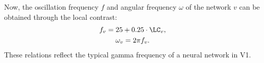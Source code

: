 Now, the oscillation  frequency $f$ and angular frequency $\omega$ of the network $v$ can be obtained through the local contrast:
\begin{gather}
    f_v = 25 + 0.25 \cdot \LC_v, \\
    \omega_v = 2 \pi f_v.
\end{gather}
These relations reflect the typical gamma frequency of a neural network in V1.
\\ 
